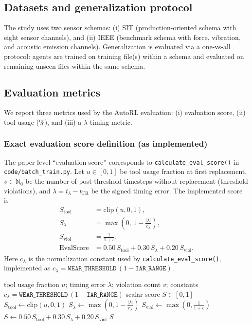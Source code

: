 \documentclass[sn-basic]{sn-jnl} %
\begin{document}
\subsection{Datasets and generalization protocol}
The study uses two sensor schemas: (i) SIT (production-oriented schema with eight sensor channels), and (ii) IEEE (benchmark schema with force, vibration, and acoustic emission channels). Generalization is evaluated via a one-vs-all protocol: agents are trained on training file(s) within a schema and evaluated on remaining unseen files within the same schema.

\subsection{Evaluation metrics} \label{sec:metrics}
We report three metrics used by the AutoRL evaluation: (i) evaluation score, (ii) tool usage (\%), and (iii) a $\lambda$ timing metric.

\subsubsection{Exact evaluation score definition (as implemented)}
The paper-level ``evaluation score'' corresponds to \texttt{calculate\_eval\_score()} in \texttt{code/batch\_train.py}. Let $u\in[0,1]$ be tool usage fraction at first replacement, $v\in\mathbb{N}_0$ be the number of post-threshold timesteps without replacement (threshold violations), and $\lambda=t_{\lambda}-t_{\mathrm{FR}}$ be the signed timing error. The implemented score is
\begin{align}
S_{\text{tool}} &= \mathrm{clip}(u,0,1),\\
S_{\lambda} &= \max\left(0,\,1-\frac{|\lambda|}{c_{\lambda}}\right),\\
S_{\text{viol}} &= \frac{1}{1+v},\\
\mathrm{EvalScore} &= 0.50\,S_{\text{tool}} + 0.30\,S_{\lambda} + 0.20\,S_{\text{viol}}.
\end{align}
Here $c_{\lambda}$ is the normalization constant used by \texttt{calculate\_eval\_score()}, implemented as $c_{\lambda}=\texttt{WEAR\_THRESHOLD}\,(1-\texttt{IAR\_RANGE})$.

\begin{algorithm}[t]
\caption{Evaluation score computation (per evaluation run)}
\label{alg:eval_score}
\begin{algorithmic}[1]
\Require tool usage fraction $u$; timing error $\lambda$; violation count $v$; constants $c_{\lambda}=\texttt{WEAR\_THRESHOLD}\,(1-\texttt{IAR\_RANGE})$
\Ensure scalar score $S\in[0,1]$
\State $S_{\mathrm{tool}} \gets \mathrm{clip}(u, 0, 1)$
\State $S_{\lambda} \gets \max\left(0, 1 - \frac{|\lambda|}{c_{\lambda}}\right)$
\State $S_{\mathrm{viol}} \gets \max\left(0, \frac{1}{1+v}\right)$
\State $S \gets 0.50\,S_{\mathrm{tool}} + 0.30\,S_{\lambda} + 0.20\,S_{\mathrm{viol}}$
\State \Return $S$
\end{algorithmic}
\end{algorithm}
\end{document}
